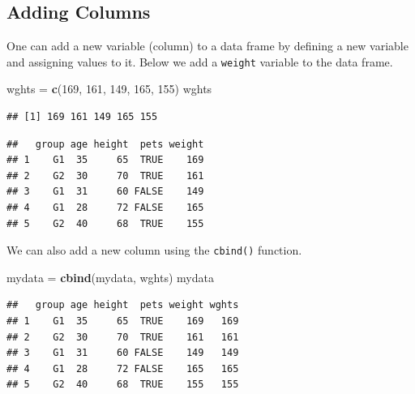 \documentclass[
]{book}
\newenvironment{Shaded}{\begin{snugshade}}{\end{snugshade}}
\newcommand{\DecValTok}[1]{\textcolor[rgb]{0.00,0.00,0.81}{#1}}
\newcommand{\KeywordTok}[1]{\textcolor[rgb]{0.13,0.29,0.53}{\textbf{#1}}}
\newcommand{\NormalTok}[1]{#1}
\newcommand{\OperatorTok}[1]{\textcolor[rgb]{0.81,0.36,0.00}{\textbf{#1}}}
\newcommand{\StringTok}[1]{\textcolor[rgb]{0.31,0.60,0.02}{#1}}
\begin{document}
\hypertarget{adding-columns}{%
\subsection*{Adding Columns}\label{adding-columns}}

One can add a new variable (column) to a data frame by defining a new variable and assigning values to it. Below we add a \texttt{weight} variable to the data frame.

\begin{Shaded}
\begin{Highlighting}[]
\NormalTok{wghts =}\StringTok{ }\KeywordTok{c}\NormalTok{(}\DecValTok{169}\NormalTok{, }\DecValTok{161}\NormalTok{, }\DecValTok{149}\NormalTok{, }\DecValTok{165}\NormalTok{, }\DecValTok{155}\NormalTok{)}
\NormalTok{wghts}
\end{Highlighting}
\end{Shaded}

\begin{verbatim}
## [1] 169 161 149 165 155
\end{verbatim}

\begin{Shaded}
\end{Shaded}

\begin{verbatim}
##   group age height  pets weight
## 1    G1  35     65  TRUE    169
## 2    G2  30     70  TRUE    161
## 3    G1  31     60 FALSE    149
## 4    G1  28     72 FALSE    165
## 5    G2  40     68  TRUE    155
\end{verbatim}

We can also add a new column using the \texttt{cbind()} function.

\begin{Shaded}
\begin{Highlighting}[]
\NormalTok{mydata =}\StringTok{ }\KeywordTok{cbind}\NormalTok{(mydata, wghts)}
\NormalTok{mydata}
\end{Highlighting}
\end{Shaded}

\begin{verbatim}
##   group age height  pets weight wghts
## 1    G1  35     65  TRUE    169   169
## 2    G2  30     70  TRUE    161   161
## 3    G1  31     60 FALSE    149   149
## 4    G1  28     72 FALSE    165   165
## 5    G2  40     68  TRUE    155   155
\end{verbatim}
\end{document}
